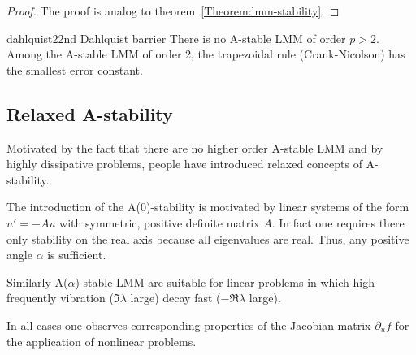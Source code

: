\begin{proof}
  The proof is analog to theorem~\ref{Theorem:lmm-stability}.
\end{proof}

\begin{Theorem*}{dahlquist2}{2nd Dahlquist barrier}
   There is no A-stable LMM of
  order $p>2$. Among the A-stable LMM of order 2, the trapezoidal rule
  (Crank-Nicolson) has the smallest error constant.
\end{Theorem*}

\subsection{Relaxed A-stability}

\begin{intro}
  Motivated by the fact that there are no higher order A-stable LMM
  and by highly dissipative problems, people have introduced relaxed
  concepts of A-stability.
\end{intro}



\begin{remark}
  The introduction of the A(0)-stability is motivated by linear
  systems of the form $u'=-Au$ with symmetric, positive definite
  matrix $A$. In fact one requires there only stability on the real
  axis because all eigenvalues are real. Thus, any positive angle
  $\alpha$ is sufficient.
  
  Similarly A($\alpha$)-stable LMM are suitable for linear problems in
  which high frequently vibration ($\Im\lambda$ large) decay fast
  ($-\Re\lambda$ large).

  In all cases one observes corresponding properties of the Jacobian
  matrix $\partial_u f$ for the application of nonlinear problems.
\end{remark}

